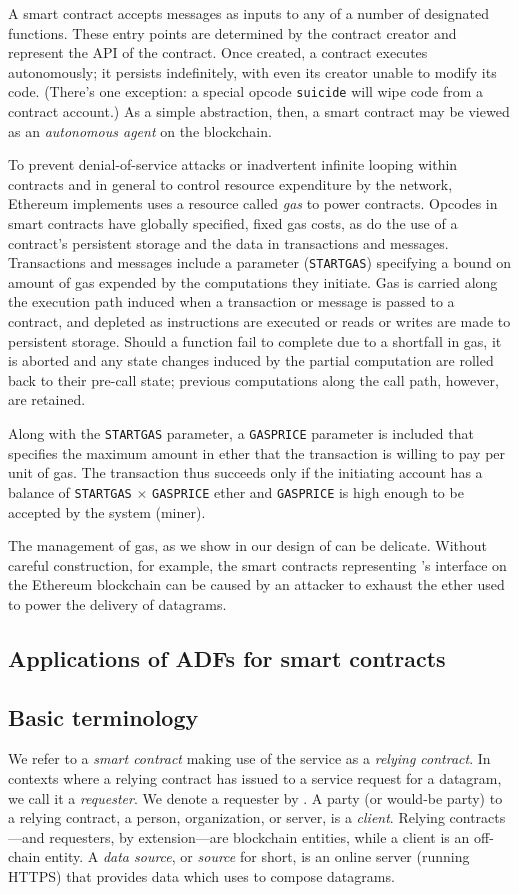 A smart contract accepts messages as inputs to any of a number of designated functions. These entry points are determined by the contract creator and represent the API of the contract. Once created, a contract executes autonomously; it persists indefinitely, with even its creator unable to modify its code. (There's one exception: a special opcode \texttt{suicide} will wipe code from a contract account.) As a simple abstraction, then, a smart contract may be viewed as an {\em autonomous agent} on the blockchain. 

To prevent denial-of-service attacks or inadvertent infinite looping within contracts and in general to control resource expenditure by the network, Ethereum implements uses a resource called \emph{gas} to power contracts. Opcodes in smart contracts have globally specified, fixed gas costs, as do the use of a contract's persistent storage and the data in transactions and messages. Transactions and messages include a parameter (\texttt{STARTGAS}) specifying a bound on amount of gas expended by the computations they initiate. Gas is carried along the execution path induced when a transaction or message is passed to a contract, and depleted as instructions are executed or reads or writes are made to persistent storage. Should a function fail to complete due to a shortfall in gas, it is aborted and any state changes induced by the partial computation are rolled back to their pre-call state; previous computations along the call path, however, are retained. 

Along with the \texttt{STARTGAS} parameter, a \texttt{GASPRICE} parameter is included that specifies the maximum amount in ether that the transaction is willing to pay per unit of gas. The transaction thus succeeds only if the initiating account has a balance of \texttt{STARTGAS} $\times$ \texttt{GASPRICE} ether and \texttt{GASPRICE} is high enough to be accepted by the system (miner). 

The management of gas, as we show in our design of \tcs can be delicate. Without careful construction, for example, the smart contracts representing \tc's interface on the Ethereum blockchain can be caused by an attacker to exhaust the ether used to power the delivery of datagrams. 

\subsection{Applications of ADFs for smart contracts}
\subsection{Basic terminology}
We refer to a {\em smart contract} making use of the \tcs service as a \emph{relying contract}. In contexts where a relying contract has issued to \tc a service request for a datagram, we call it a \emph{requester}. We denote a requester by \reqcont. A party (or would-be party) to a relying contract, a person, organization, or server, is a \emph{client}. Relying contracts---and requesters, by extension---are blockchain entities, while a client is an off-chain entity. A \emph{data source}, or \emph{source} for short, is an online server (running HTTPS) that provides data which \tc uses to compose datagrams.


